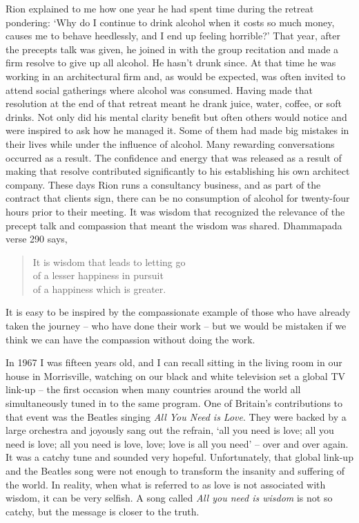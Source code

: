 Rion explained to me how one year he had spent time during the retreat
pondering: `Why do I continue to drink alcohol when it costs so much
money, causes me to behave heedlessly, and I end up feeling horrible?'
That year, after the precepts talk was given, he joined in with the
group recitation and made a firm resolve to give up all alcohol. He
hasn't drunk since. At that time he was working in an architectural firm
and, as would be expected, was often invited to attend social gatherings
where alcohol was consumed. Having made that resolution at the end of
that retreat meant he drank juice, water, coffee, or soft drinks. Not
only did his mental clarity benefit but often others would notice and
were inspired to ask how he managed it. Some of them had made big
mistakes in their lives while under the influence of alcohol. Many
rewarding conversations occurred as a result. The confidence and energy
that was released as a result of making that resolve contributed
significantly to his establishing his own architect company. These days
Rion runs a consultancy business, and as part of the contract that
clients sign, there can be no consumption of alcohol for twenty-four
hours prior to their meeting. It was wisdom that recognized the
relevance of the precept talk and compassion that meant the wisdom was
shared. Dhammapada verse 290 says,

\begin{quote}
  It is wisdom that leads to letting go\\
  of a lesser happiness in pursuit\\
  of a happiness which is greater.
\end{quote}

It is easy to be inspired by the compassionate example of those who have
already taken the journey -- who have done their work -- but we would be
mistaken if we think we can have the compassion without doing the work.

In 1967 I was fifteen years old, and I can recall sitting in the living
room in our house in Morrisville, watching on our black and white
television set a global TV link-up\cite{satellite}
 -- the first occasion when many countries around
the world all simultaneously tuned in to the same program. One of
Britain's contributions to that event was the Beatles singing \emph{All
You Need is Love}. They were backed by a large orchestra and joyously
sang out the refrain, `all you need is love; all you need is love; all
you need is love, love; love is all you need' -- over and over again. It
was a catchy tune and sounded very hopeful. Unfortunately, that global
link-up and the Beatles song were not enough to transform the insanity
and suffering of the world. In reality, when what is referred to as love
is not associated with wisdom, it can be very selfish. A song called
\emph{All you need is wisdom} is not so catchy, but the message is
closer to the truth.

